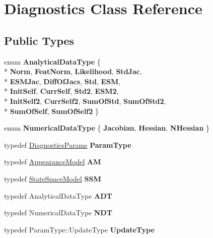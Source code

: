 \hypertarget{classDiagnostics}{\section{Diagnostics Class Reference}
\label{classDiagnostics}
}
\subsection*{Public Types}
\begin{DoxyCompactItemize}
\item 
enum {\bfseries Analytical\-Data\-Type} \{ \\*
{\bfseries Norm}, 
{\bfseries Feat\-Norm}, 
{\bfseries Likelihood}, 
{\bfseries Std\-Jac}, 
\\*
{\bfseries E\-S\-M\-Jac}, 
{\bfseries Diff\-Of\-Jacs}, 
{\bfseries Std}, 
{\bfseries E\-S\-M}, 
\\*
{\bfseries Init\-Self}, 
{\bfseries Curr\-Self}, 
{\bfseries Std2}, 
{\bfseries E\-S\-M2}, 
\\*
{\bfseries Init\-Self2}, 
{\bfseries Curr\-Self2}, 
{\bfseries Sum\-Of\-Std}, 
{\bfseries Sum\-Of\-Std2}, 
\\*
{\bfseries Sum\-Of\-Self}, 
{\bfseries Sum\-Of\-Self2}
 \}
\item 
enum {\bfseries Numerical\-Data\-Type} \{ {\bfseries Jacobian}, 
{\bfseries Hessian}, 
{\bfseries N\-Hessian}
 \}
\item 
\hypertarget{classDiagnostics_aaa74367def8ecd47fb74ed8139fdb597}{typedef \hyperlink{structDiagnosticsParams}{Diagnostics\-Params} {\bfseries Param\-Type}}\label{classDiagnostics_aaa74367def8ecd47fb74ed8139fdb597}

\item 
\hypertarget{classDiagnostics_a799ea9a90dd339554076d5b75a4a729b}{typedef \hyperlink{classAppearanceModel}{Appearance\-Model} {\bfseries A\-M}}\label{classDiagnostics_a799ea9a90dd339554076d5b75a4a729b}

\item 
\hypertarget{classDiagnostics_a60b812b16f0ec8d07415a767b4ca4c13}{typedef \hyperlink{classStateSpaceModel}{State\-Space\-Model} {\bfseries S\-S\-M}}\label{classDiagnostics_a60b812b16f0ec8d07415a767b4ca4c13}

\item 
\hypertarget{classDiagnostics_ab119ce19e765c876b51813134d41472a}{typedef Analytical\-Data\-Type {\bfseries A\-D\-T}}\label{classDiagnostics_ab119ce19e765c876b51813134d41472a}

\item 
\hypertarget{classDiagnostics_a1c065aa9240fa0b6c2a969f50e4300ef}{typedef Numerical\-Data\-Type {\bfseries N\-D\-T}}\label{classDiagnostics_a1c065aa9240fa0b6c2a969f50e4300ef}

\item 
\hypertarget{classDiagnostics_af33d67ba361be1ef33213b92aadd7110}{typedef Param\-Type\-::\-Update\-Type {\bfseries Update\-Type}}\label{classDiagnostics_af33d67ba361be1ef33213b92aadd7110}

\end{DoxyCompactItemize}
